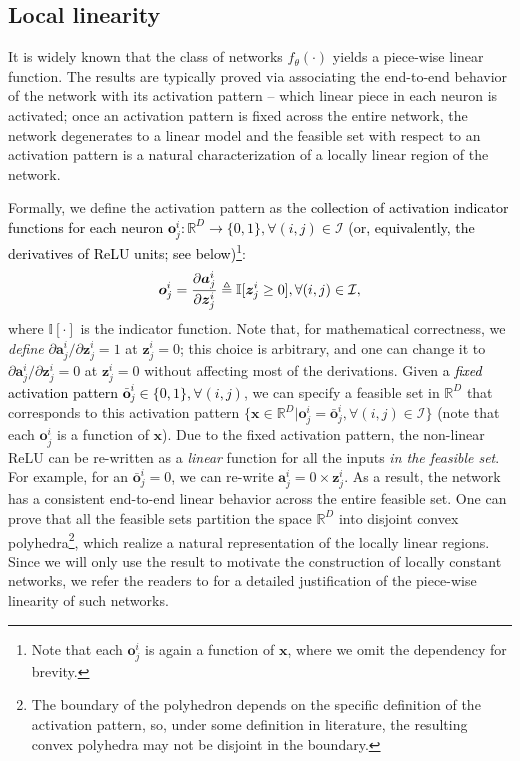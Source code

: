 \documentclass{article} \usepackage{iclr2020_conference,times}
\newcommand{\camera}[1]{\textcolor{black}{#1}}
\def\va{{\bm{a}}}
\def\vo{{\bm{o}}}
\def\vx{{\bm{x}}}
\def\vz{{\bm{z}}}
\def\gI{{\mathcal{I}}}
\def\sR{{\mathbb{R}}}
\newcommand{\one}{\mathbb{I}}
\begin{document}
\subsection{Local linearity}\label{sec:local_linear}
\vspace{-1mm}
It is widely known that the class of networks $f_\theta(\cdot)$ yields a piece-wise linear function. The results are typically proved via associating the end-to-end behavior of the network with its activation pattern -- which linear piece in each neuron is activated; once an activation pattern is fixed across the entire network, the network degenerates to a linear model and the feasible set with respect to an activation pattern is a natural characterization of a locally linear region of the network. 



Formally, we define the activation pattern as the \camera{collection of activation indicator functions for each neuron $\vo^i_j: \sR^D \to \{0, 1\}, \forall (i, j) \in \gI$ (or, equivalently, the derivatives of ReLU units; see below)}\footnote{Note that each $\vo^i_j$ is again a function of $\vx$, where we omit the dependency for brevity.}:
\begin{align}
\vspace{-1mm}
    \vo^i_j = \frac{\partial \va^i_j}{\partial \vz^i_j} \triangleq 
    \one[\vz^i_j \geq 0],
\forall (i, j) \in \gI, \label{eq:actpattern}
\vspace{-1mm}
\end{align}
where $\one[\cdot]$ is the indicator function. Note that, for mathematical correctness, we \emph{define} $\partial \va^i_j / \partial \vz^i_j = 1$ at $\vz^i_j = 0$; this choice is arbitrary, and one can change it to $\partial \va^i_j / \partial \vz^i_j = 0$ at $\vz^i_j = 0$ without affecting most of the derivations.
Given \camera{a \emph{fixed} activation pattern $\bar \vo^i_j \in \{0, 1\}, \forall (i, j)$}, we can specify a feasible set in $\sR^D$ that corresponds to this activation pattern 
$\{\vx \in \sR^D | \vo^i_j = \bar \vo^i_j, \forall (i, j) \in \gI\}$ (note that each $\vo^i_j$ is a function of $\vx$). Due to the fixed activation pattern, the non-linear ReLU can be re-written as a \emph{linear} function for all the inputs \emph{in the feasible set}. For example, for an $\bar \vo^i_j = 0$, we can re-write $\va^i_j = 0 \times \vz^i_j$. As a result, the network has a consistent end-to-end linear behavior across the entire feasible set. One can prove that all the feasible sets partition the space $\sR^D$ into disjoint convex polyhedra\footnote{The boundary of the polyhedron depends on the specific definition of the activation pattern, so, under some definition in literature, the resulting convex polyhedra may not be disjoint in the boundary.}, which realize a natural representation of the locally linear regions. Since we will only use the result to motivate the construction of locally constant networks, we refer the readers to \citet{lee2018towards} for a detailed justification of the piece-wise linearity of such networks. 
\end{document}
